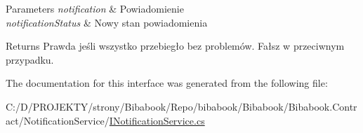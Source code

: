 \begin{DoxyParams}{Parameters}
{\em notification} & Powiadomienie\\
\hline
{\em notification\+Status} & Nowy stan powiadomienia\\
\hline
\end{DoxyParams}
\begin{DoxyReturn}{Returns}
Prawda jeśli wszystko przebiegło bez problemów. Fałsz w przeciwnym przypadku.
\end{DoxyReturn}


The documentation for this interface was generated from the following file\+:\begin{DoxyCompactItemize}
\item 
C\+:/\+D/\+P\+R\+O\+J\+E\+K\+T\+Y/strony/\+Bibabook/\+Repo/bibabook/\+Bibabook/\+Bibabook.\+Contract/\+Notification\+Service/\hyperlink{_i_notification_service_8cs}{I\+Notification\+Service.\+cs}\end{DoxyCompactItemize}
